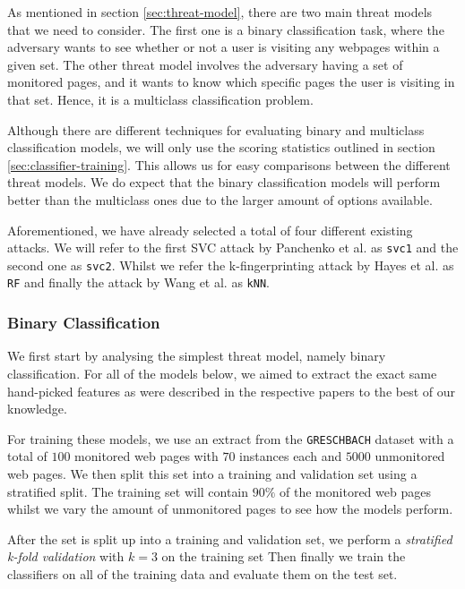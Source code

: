As mentioned in section \ref{sec:threat-model}, there are two main threat models that we need to consider.
The first one is a binary classification task, where the adversary wants to see whether or not a user is visiting any webpages within a given set.
The other threat model involves the adversary having a set of monitored pages, and it wants to know which specific pages the user is visiting in that set.
Hence, it is a multiclass classification problem.

Although there are different techniques for evaluating binary and multiclass classification models, we will only use the scoring statistics outlined in section \ref{sec:classifier-training}.
This allows us for easy comparisons between the different threat models.
We do expect that the binary classification models will perform better than the multiclass ones due to the larger amount of options available.

Aforementioned, we have already selected a total of four different existing attacks.
We will refer to the first SVC attack by Panchenko et al. \cite{panchenko1} as \texttt{svc1} and the second one \cite{panchenko2} as \texttt{svc2}.
Whilst we refer the k-fingerprinting attack by Hayes et al. \cite{kfingerprinting} as \texttt{RF} and finally the attack by Wang et al. \cite{wang_cai_johnson_nithyanand_goldberg_2014} as \texttt{kNN}.

\subsubsection{Binary Classification}

We first start by analysing the simplest threat model, namely binary classification.
For all of the models below, we aimed to extract the exact same hand-picked features as were described in the respective papers to the best of our knowledge.

For training these models, we use an extract from the \texttt{GRESCHBACH} dataset with a total of $100$ monitored web pages with $70$ instances each and $5000$ unmonitored web pages.
We then split this set into a training and validation set using a stratified split.
The training set will contain $90\%$ of the monitored web pages whilst we vary the amount of unmonitored pages to see how the models perform.

After the set is split up into a training and validation set, we perform a \textit{stratified k-fold validation} with $k = 3$ on the training set
Then finally we train the classifiers on all of the training data and evaluate them on the test set.

